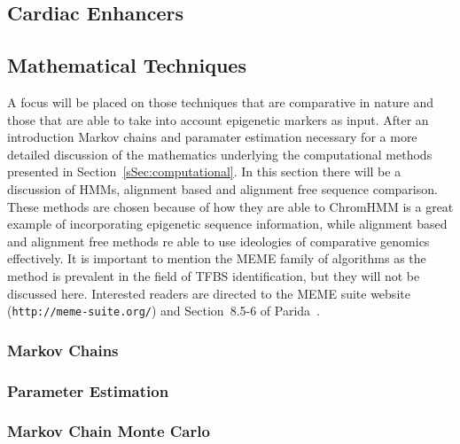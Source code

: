 \documentclass[12pt,a4paper]{article}
\begin{document}
        \subsection{Cardiac Enhancers}
        
        \subsection{Mathematical Techniques}
        \label{sSec:mathematical}
        A focus will be placed on those techniques that are comparative in nature and those that are able to take into account epigenetic markers as input. After an introduction Markov chains and paramater estimation necessary for a more detailed discussion of the mathematics underlying the computational methods presented in Section~\ref{sSec:computational}. In this section there will be a discussion of HMMs, alignment based and alignment free sequence comparison. These methods are chosen because of how they are able to ChromHMM is a great example of incorporating epigenetic sequence information, while alignment based and alignment free methods re able to use ideologies of comparative genomics effectively. It is important to mention the MEME family of algorithms as the method is prevalent in the field of TFBS identification, but they will not be discussed here. %
        Interested readers are directed to the MEME suite website (\texttt{http://meme-suite.org/}) and Section~8.5-6 of Parida~\cite{parida2007pattern}. 

            

            \subsubsection{Markov Chains}
            
            
            \subsubsection{Parameter Estimation}
            
            
            \subsubsection{Markov Chain Monte Carlo}
            
            
\end{document}
